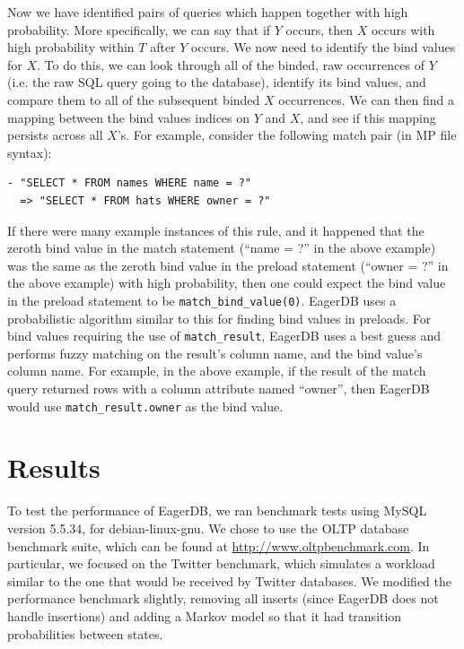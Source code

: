 \documentclass[12pt]{article}
\begin{document}
Now we have identified pairs of queries which happen together with high probability. More specifically, we can say that if $Y$ occurs, then $X$ occurs with high probability within $T$ after $Y$ occurs. We now need to identify the bind values for $X$. To do this, we can look through all of the binded, raw occurrences of $Y$ (i.e. the raw SQL query going to the database), identify its bind values, and compare them to all of the subsequent binded $X$ occurrences. We can then find a mapping between the bind values indices on $Y$ and $X$, and see if this mapping persists across all $X$'s. For example, consider the following match pair (in MP file syntax):

\begin{lstlisting}
- "SELECT * FROM names WHERE name = ?"
  => "SELECT * FROM hats WHERE owner = ?"
\end{lstlisting}

If there were many example instances of this rule, and it happened that the zeroth bind value in the match statement (``name = ?'' in the above example) was the same as the zeroth bind value in the preload statement (``owner = ?'' in the above example) with high probability, then one could expect the bind value in the preload statement to be \texttt{match\_bind\_value(0)}. EagerDB uses a probabilistic algorithm similar to this for finding bind values in preloads. For bind values requiring the use of \texttt{match\_result}, EagerDB uses a best guess and performs fuzzy matching on the result's column name, and the bind value's column name. For example, in the above example, if the result of the match query returned rows with a column attribute named ``owner'', then EagerDB would use \texttt{match\_result.owner} as the bind value.

\section{Results}

To test the performance of EagerDB, we ran benchmark tests using MySQL version 5.5.34, for debian-linux-gnu. We chose to use the OLTP database benchmark suite, which can be found at \url{http://www.oltpbenchmark.com}. In particular, we focused on the Twitter benchmark, which simulates a workload similar to the one that would be received by Twitter databases. We modified the performance benchmark slightly, removing all inserts (since EagerDB does not handle insertions) and adding a Markov model so that it had transition probabilities between states.
\end{document}

